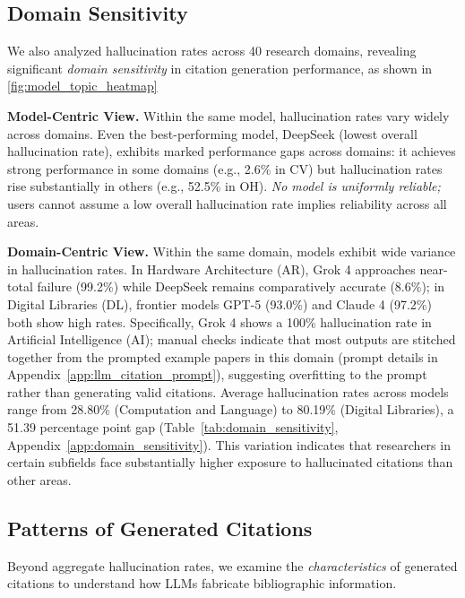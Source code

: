 \subsection{Domain Sensitivity}
We also analyzed hallucination rates across 40 research domains, revealing significant \textit{domain sensitivity} in citation generation performance, as shown in \cref{fig:model_topic_heatmap}

\noindent
\textbf{Model-Centric View.}
Within the same model, hallucination rates vary widely across domains. Even the best-performing model, DeepSeek (lowest overall hallucination rate), exhibits marked performance gaps across domains: it achieves strong performance in some domains (e.g., 2.6\% in CV) but hallucination rates rise substantially in others (e.g., 52.5\% in OH).
\textit{No model is uniformly reliable;} users cannot assume a low overall hallucination rate implies reliability across all areas.

\noindent
\textbf{Domain-Centric View.}
Within the same domain, models exhibit wide variance in hallucination rates.
In Hardware Architecture (AR), Grok 4 approaches near-total failure (99.2\%) while DeepSeek remains comparatively accurate (8.6\%); in Digital Libraries (DL), frontier models GPT-5 (93.0\%) and Claude 4 (97.2\%) both show high rates.
Specifically, Grok 4 shows a 100\% hallucination rate in Artificial Intelligence (AI); manual checks indicate that most outputs are stitched together from the prompted example papers in this domain (prompt details in Appendix~\ref{app:llm_citation_prompt}), suggesting overfitting to the prompt rather than generating valid citations.
Average hallucination rates across models range from 28.80\% (Computation and Language) to 80.19\% (Digital Libraries), a 51.39 percentage point gap (Table~\ref{tab:domain_sensitivity}, Appendix~\ref{app:domain_sensitivity}).
This variation indicates that researchers in certain subfields face substantially higher exposure to hallucinated citations than other areas.



\subsection{Patterns of Generated Citations}

Beyond aggregate hallucination rates, we examine the \textit{characteristics} of generated citations to understand how LLMs fabricate bibliographic information.

